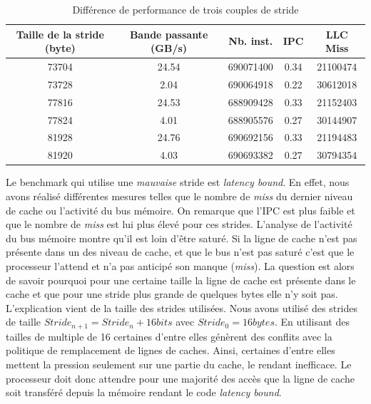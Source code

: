         
        \begin{table}[]
        \centering
        \begin{tabular}{|c|c|c|c|c|}
        \hline
        \rowcolor[HTML]{EFEFEF} 
        Taille de la stride (byte) & Bande passante (GB/s) & Nb. inst. & IPC & LLC Miss \\ \hline
        \rowcolor[HTML]{FFFFC7} 
        73704 & 24.54 & 690071400 & 0.34 & 21100474 \\ \hline
        \rowcolor[HTML]{FFFFC7} 
        73728 & 2.04 & 690064918 & 0.22 & 30612018 \\ \hline
        \rowcolor[HTML]{E8FFFE} 
        77816 & 24.53 & 688909428 & 0.33 & 21152403 \\ \hline
        \rowcolor[HTML]{E8FFFE} 
        77824 & 4.01 & 688905576 & 0.27 & 30144907 \\ \hline
        \rowcolor[HTML]{E6FFE6} 
        81928 & 24.76 & 690692156 & 0.33 & 21194483 \\ \hline
        \rowcolor[HTML]{E6FFE6} 
        81920 & 4.03 & 690693382 & 0.27 & 30794354 \\ \hline
        \end{tabular}%
        \caption{Différence de performance de trois couples de stride}
        \label{tab:dml_bad_strides}
        \end{table}
        
        
        Le benchmark qui utilise une \textit{mauvaise} stride est \textit{latency bound}. En effet, nous avons réalisé différentes mesures telles que le nombre de \textit{miss} du dernier niveau de cache ou l'activité du bus mémoire. On remarque que l'IPC est plus faible et que le nombre de \textit{miss} est lui plus élevé pour ces strides. L'analyse de l'activité du bus mémoire montre qu'il est loin d'être saturé. Si la ligne de cache n'est pas présente dans un des niveau de cache, et que le bus n'est pas saturé c'est que le processeur l'attend et n'a pas anticipé son manque (\textit{miss}). La question est alors de savoir pourquoi pour une certaine taille la ligne de cache est présente dans le cache et que pour une stride plus grande de quelques bytes elle n'y soit pas. L'explication vient de la taille des strides utilisées. Nous avons utilisé des strides de taille $ Stride_{n+1} = Stride_n + 16 bits$ avec $Stride_0 = 16 bytes$. En utilisant des tailles de multiple de 16 certaines d'entre elles génèrent des conflits avec la politique de remplacement de lignes de caches. Ainsi, certaines d'entre elles mettent la pression seulement sur une partie du cache, le rendant inefficace. Le processeur doit donc attendre pour une majorité des accès que la ligne de cache soit transféré depuis la mémoire rendant le code \textit{latency bound}.
        
